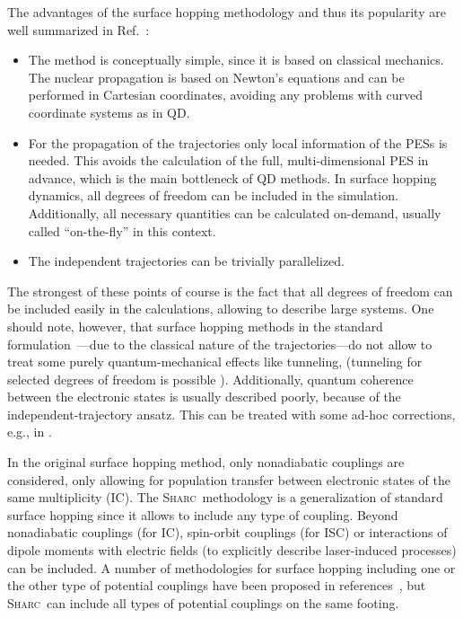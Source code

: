 \documentclass[a4paper,10pt,DIV=15,openany]{scrbook}
\newcommand{\sharc}{\textsc{Sharc}}
\begin{document}
The advantages of the surface hopping methodology and thus its popularity are well summarized in Ref.~\cite{Barbatti2011WCMS}:
\begin{itemize}
  \item The method is conceptually simple, since it is based on classical mechanics. The nuclear propagation is based on Newton's equations and can be performed in Cartesian coordinates, avoiding any problems with curved coordinate systems as in QD.
  \item For the propagation of the trajectories only local information of the PESs is needed. This avoids the calculation of the full, multi-dimensional PES in advance, which is the main bottleneck of QD methods. In surface hopping dynamics, all degrees of freedom can be included in the simulation. Additionally, all necessary quantities can be calculated on-demand, usually called ``on-the-fly'' in this context.
  \item The independent trajectories can be trivially parallelized.
\end{itemize}
The strongest of these points of course is the fact that all degrees of freedom can be included easily in the calculations, allowing to describe large systems.
One should note, however, that surface hopping methods in the standard formulation~\cite{Tully1971JCP, Tully1990JCP}---due to  the classical nature of the trajectories---do not allow to treat some purely quantum-mechanical effects like tunneling, (tunneling for selected degrees of freedom is possible \cite{Hammes-Schiffer1994JCP}). Additionally, quantum coherence between the electronic states is usually described poorly, because of the independent-trajectory ansatz. This can be treated with some ad-hoc corrections, e.g., in \cite{Granucci2007JCP}.

In the original surface hopping method, only nonadiabatic couplings are considered, only allowing for population transfer between electronic states of the same multiplicity (IC). 
The \sharc\ methodology is a generalization of standard surface hopping since it allows to include any type of coupling. Beyond nonadiabatic couplings (for IC), spin-orbit couplings (for ISC) or interactions of dipole moments with electric fields (to explicitly describe laser-induced processes) can be included.
A number of methodologies for surface hopping including one or the other type of potential couplings have been proposed in references~\cite{Thachuk1996JCP,Maiti2004JPCA,Jones2008JPCA,Mitric2009PRA,Granucci2012JCP,Curchod2013C,Cui2014JCP}, but \sharc\ can include all types of potential couplings on the same footing. 
\end{document}
